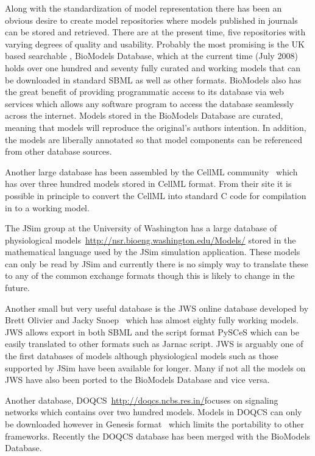 \documentclass[12pt]{article}
\begin{document}
Along with the standardization of model representation there has
been an obvious desire to create model repositories where models
published in journals can be stored and retrieved. There are at the
present time, five repositories with varying degrees of quality and
usability. Probably the most promising is the UK based searchable ,
BioModels Database, which at the current time (July 2008) holds over
one hundred and seventy fully curated and working models that can be
downloaded in standard SBML as well as other formats. BioModels also
has the great benefit of providing programmatic access to its
database via web services which allows any software program to
access the database seamlessly across the internet. Models stored in
the BioModels Database are curated, meaning that models will
reproduce the original's authors intention. In addition, the models
are liberally annotated so that model components can be referenced
from other database sources.

Another large database has been assembled by the CellML community~\cite{Lloyd:2008}
which has over three hundred models stored in CellML format. From their site it is possible in principle to convert the CellML into standard C code for compilation in to a working model.

The JSim group at the University of Washington has a large database of physiological models~\url{http://nsr.bioeng.washington.edu/Models/} stored in the mathematical language used by the JSim simulation application. These models can only be read by JSim and currently there is no simply way to translate these to any of the common exchange formats though this is likely to change in the future.

Another small but very useful database is the JWS online database
developed by Brett Olivier and Jacky Snoep~\citep{olivier:2004} which
has almost eighty fully working models. JWS allows export in both
SBML and the script format PySCeS which can be easily translated to
other formats such as Jarnac script. JWS is arguably one of the
first databases of models although physiological models such as
those supported by JSim have been available for longer. Many if not
all the models on JWS have also been ported to the BioModels
Database and vice versa.

Another database, DOQCS~\url{http://doqcs.ncbs.res.in/}focuses on signaling networks which contains
over two hundred models. Models in DOQCS can only be downloaded
however in Genesis format~\citep{kinetikit:2002} which limits the portability to other
frameworks. Recently the DOQCS database has been merged with the
BioModels Database.
\end{document}
